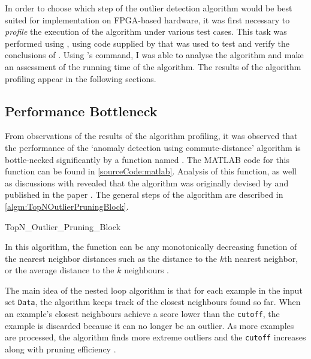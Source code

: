 In order to choose which step of the outlier detection algorithm would be best
suited for implementation on \gls{FPGA}-based hardware, it was first necessary
to \emph{profile} the execution of the algorithm under various test cases. This
task was performed using , using code supplied by
\citeauthor{Khoa:2012} that was used to test and verify the conclusions of
. Using 's  command, I
was able to analyse the algorithm and make an assessment of the running time of
the algorithm. The results of the algorithm profiling appear in the following
sections.

\subsection{Performance Bottleneck}
\label{algorithmPerformance:bottleneck}
From observations of the results of the algorithm profiling, it was observed
that the performance of the `anomaly detection using commute-distance' algorithm
is bottle-necked significantly by a function named
. The MATLAB code for this function can be
found in \autoref{sourceCode:matlab}. Analysis of this function, as well as
discussions with \citeauthor{Khoa:2012} revealed that the algorithm was
originally devised by \citeauthor{Bay:2003} and published in the paper
. The general steps of the algorithm are described in
\autoref{algm:TopNOutlierPruningBlock}.

\begin{algorithm}
    
    \caption{TopN\_Outlier\_Pruning\_Block}
    \label{algm:TopNOutlierPruningBlock}
\end{algorithm}

In this algorithm, the  function can be any monotonically
decreasing function of the nearest neighbor distances such as the distance to
the $k$th nearest neighbor, or the average distance to the $k$ neighbours
\cite{Bay:2003}.

The main idea of the nested loop algorithm is that for each example in the
input set \verb+Data+, the algorithm keeps track of the closest neighbours found
so far. When an example's closest neighbours achieve a score lower than the
\verb+cutoff+, the example is discarded because it can no longer be an outlier.
As more examples are processed, the algorithm finds more extreme outliers and
the \verb+cutoff+ increases along with pruning efficiency \cite{Bay:2003}.

